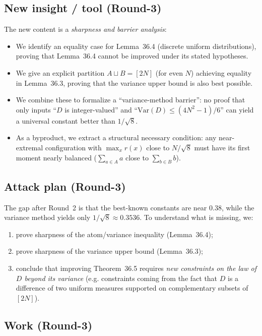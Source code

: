 \subsection{New insight / tool (Round-3)}
The new content is a \emph{sharpness and barrier analysis}:
\begin{itemize}
\item We identify an equality case for Lemma~36.4 (discrete uniform distributions), proving that Lemma~36.4 cannot be improved under its stated hypotheses.
\item We give an explicit partition \(A\sqcup B=[2N]\) (for even \(N\)) achieving equality in Lemma~36.3, proving that the variance upper bound is also best possible.
\item We combine these to formalize a ``variance-method barrier'': no proof that only inputs ``\(D\) is integer-valued'' and ``\(\mathrm{Var}(D)\le (4N^2-1)/6\)'' can yield a universal constant better than \(1/\sqrt 8\).
\item As a byproduct, we extract a structural necessary condition: any near-extremal configuration with \(\max_x r(x)\) close to \(N/\sqrt 8\) must have its first moment nearly balanced (\(\sum_{a\in A} a\) close to \(\sum_{b\in B} b\)).
\end{itemize}

\subsection{Attack plan (Round-3)}
The gap after Round~2 is that the best-known constants are near \(0.38\), while the variance method yields only \(1/\sqrt 8\approx 0.3536\).
To understand what is missing, we:
\begin{enumerate}
\item prove sharpness of the atom/variance inequality (Lemma~36.4);
\item prove sharpness of the variance upper bound (Lemma~36.3);
\item conclude that improving Theorem~36.5 requires 
\emph{new constraints on the law of \(D\) beyond its variance} (e.g. constraints coming from the fact that \(D\) is a difference of two uniform measures supported on complementary subsets of \([2N]\)).
\end{enumerate}

\subsection{Work (Round-3)}

